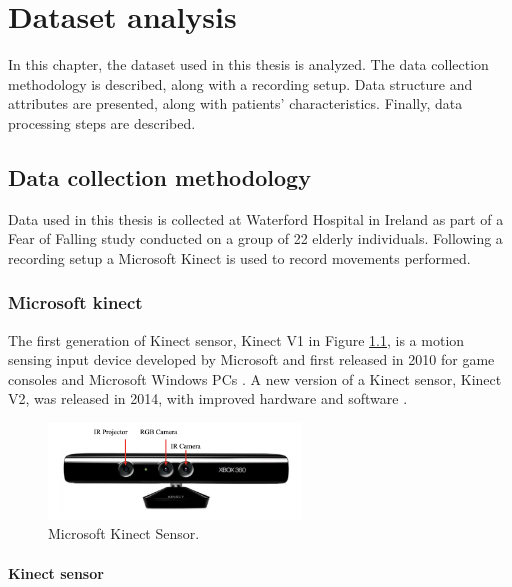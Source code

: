 \hypersetup{colorlinks=true, linkcolor=blue, citecolor=red}

\chapter{Dataset analysis} \label{chap:dataset_analysis}

    In this chapter, the dataset used in this thesis is analyzed. The data collection methodology is described, along with a recording setup. Data structure and attributes are presented, along with patients' characteristics. Finally, data processing steps are described.

    \section{Data collection methodology}
        
        Data used in this thesis is collected at Waterford Hospital in Ireland as part of a Fear of Falling study conducted on a group of 22 elderly individuals. Following a recording setup a Microsoft Kinect is used to record movements performed. 

        \subsection{Microsoft kinect}

            The first generation of Kinect sensor, Kinect V1 in Figure \ref{fig:kinect_sensor}, is a motion sensing input device developed by Microsoft and first released in 2010 for game consoles and Microsoft Windows PCs \cite{xu_validity_2015}. A new version of a Kinect sensor, Kinect V2, was released in 2014, with improved hardware and software \cite{cruz_kinect_2012}. 

            \begin{figure}[H]
                \centering
                \includegraphics[width=0.6\textwidth]{./resources/images/kinect/kinect.png}
                \caption{Microsoft Kinect Sensor.}
                \label{fig:kinect_sensor}
            \end{figure}

                    \subsubsection{Kinect sensor} 

